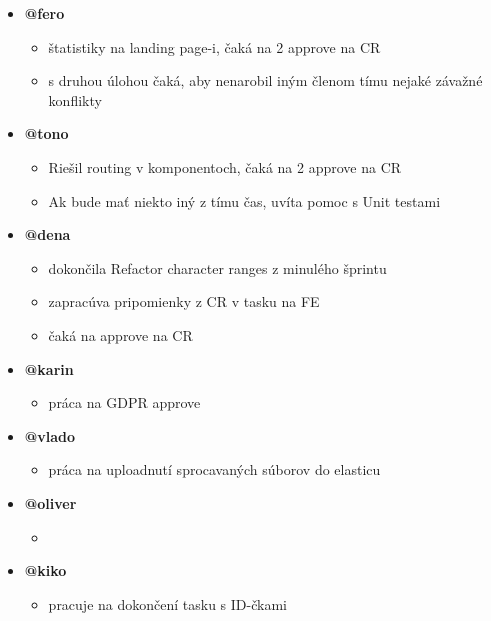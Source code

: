\documentclass{article}
\begin{document}
    \begin{itemize}
        \item \textbf {@fero}
        \begin{itemize}
            \item štatistiky na landing page-i, čaká na 2 approve na CR
            \item s druhou úlohou čaká, aby nenarobil iným členom tímu nejaké závažné konflikty
        \end{itemize}
        \item \textbf {@tono}
        \begin{itemize}
            \item Riešil routing v komponentoch, čaká na 2 approve na CR 
            \item Ak bude mať niekto iný z tímu čas, uvíta pomoc s Unit testami
        \end{itemize}
        \item \textbf {@dena}
        \begin{itemize}
            \item dokončila Refactor character ranges z minulého šprintu
            \item zapracúva pripomienky z CR v tasku na FE
            \item čaká na approve na CR
        \end{itemize}
        \item \textbf {@karin}
        \begin{itemize}
            \item práca na GDPR approve
        \end{itemize}
        \item \textbf {@vlado}
        \begin{itemize}
            \item práca na uploadnutí sprocavaných súborov do elasticu
        \end{itemize}
        \item \textbf {@oliver}
        \begin{itemize}
            \item 
        \end{itemize}
        \item \textbf {@kiko}
        \begin{itemize}
            \item pracuje na dokončení tasku s ID-čkami
        \end{itemize}
    \end{itemize}    
\end{document}
